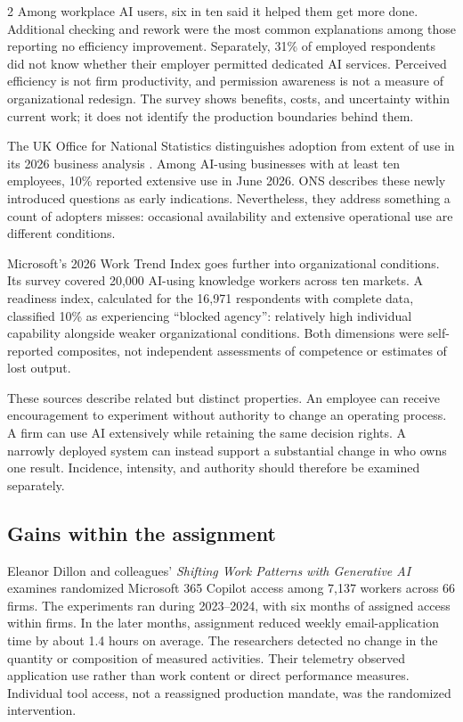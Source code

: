 \begin{multicols}{2}
Among workplace AI users, six in ten said it helped them get more done.
Additional checking and rework were the most common explanations among
those reporting no efficiency improvement. Separately, 31\% of employed
respondents did not know whether their employer permitted dedicated AI
services. Perceived efficiency is not firm productivity, and permission
awareness is not a measure of organizational redesign. The survey shows
benefits, costs, and uncertainty within current work; it does not
identify the production boundaries behind them.

The UK Office for National Statistics distinguishes adoption from extent
of use in its 2026 business analysis \citep{ons2026businesses}. Among
AI-using businesses with at least ten employees, 10\% reported extensive
use in June 2026. ONS describes these newly introduced questions as
early indications. Nevertheless, they address something a count of
adopters misses: occasional availability and extensive operational use
are different conditions.

Microsoft's 2026 Work Trend Index \citep{microsoft2026wti} goes further
into organizational conditions. Its survey covered 20,000 AI-using
knowledge workers across ten markets. A readiness index, calculated for
the 16,971 respondents with complete data, classified 10\% as
experiencing ``blocked agency'': relatively high individual capability
alongside weaker organizational conditions. Both dimensions were
self-reported composites, not independent assessments of competence or
estimates of lost output.

These sources describe related but distinct properties. An employee can
receive encouragement to experiment without authority to change an
operating process. A firm can use AI extensively while retaining the
same decision rights. A narrowly deployed system can instead support a
substantial change in who owns one result. Incidence, intensity, and
authority should therefore be examined separately.

\subsection{Gains within the
assignment}\label{gains-within-the-assignment}

Eleanor Dillon and colleagues' \emph{Shifting Work Patterns with
Generative AI} \citep{dillon2025workpatterns} examines randomized
Microsoft 365 Copilot access among 7,137 workers across 66 firms. The
experiments ran during 2023--2024, with six months of assigned access
within firms. In the later months, assignment reduced weekly
email-application time by about 1.4 hours on average. The researchers
detected no change in the quantity or composition of measured
activities. Their telemetry observed application use rather than work
content or direct performance measures. Individual tool access, not a
reassigned production mandate, was the randomized intervention.


\end{multicols}

